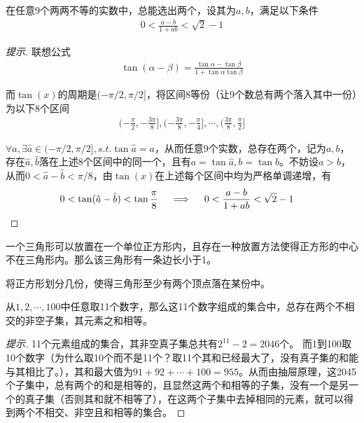 \begin{example}
  在任意9个两两不等的实数中，总能选出两个，设其为$a,b$，满足以下条件
  \begin{align*}
    0 < \frac{a-b}{1+ab} < \sqrt2 -1
  \end{align*}
\end{example}

\begin{proof}[提示]
  联想公式
  \begin{align*}
    \tan(\alpha-\beta)=\frac{\tan\alpha-\tan\beta}{1+\tan\alpha\tan\beta}
  \end{align*}

  而$\tan(x)$的周期是$(-\pi/2, \pi/2]$，将区间8等份（让9个数总有两个落入其中一份）为以下8个区间
  \begin{align*}
    (-\frac\pi2, -\frac{3\pi}8], (-\frac{3\pi}8, -\frac\pi4], \cdots, (\frac{3\pi}8, \frac\pi2]
  \end{align*}

  $\forall a, \exists\hat a\in(-\pi/2, \pi/2], s.t. \tan\hat a = a$，从而任意9个实数，总存在两个，记为$a,b$，存在$\hat a, \hat b$落在上述8个区间中的同一个，且有$a=\tan\hat a, b=\tan\hat b$。不妨设$a>b$，从而$0<\hat a-\hat b<\pi/8$，由$\tan(x)$在上述每个区间中均为严格单调递增，有
  \begin{align*}
    0 < \tan(\hat a - \hat b) < \tan\frac\pi8 
    \quad \implies \quad
    0 < \frac{a - b}{1+ab} < \sqrt2 - 1&\qedhere
  \end{align*}
\end{proof}


\begin{question}
  一个三角形可以放置在一个单位正方形内，且存在一种放置方法使得正方形的中心不在三角形内。那么该三角形有一条边长小于1。
\end{question}

\hints 将正方形划分几份，使得三角形至少有两个顶点落在某份中。

\begin{question}
  从$1,2,\cdots,100$中任意取11个数字，那么这11个数字组成的集合中，总存在两个不相交的非空子集，其元素之和相等。
\end{question}
\begin{proof}[提示]
11个元素组成的集合，其非空真子集总共有$2^{11}-2=2046$个。
而1到100取10个数字（\think 为什么取10个而不是11个？取11个其和已经最大了，没有真子集的和能与其相比了。），其和最大值为$91+92+\cdots+100=955$。从而由抽屉原理，这2045个子集中，总有两个的和是相等的，且显然这两个和相等的子集，没有一个是另一个的真子集（否则其和就不相等了），在这两个子集中去掉相同的元素，就可以得到两个不相交、非空且和相等的集合。
\end{proof}

